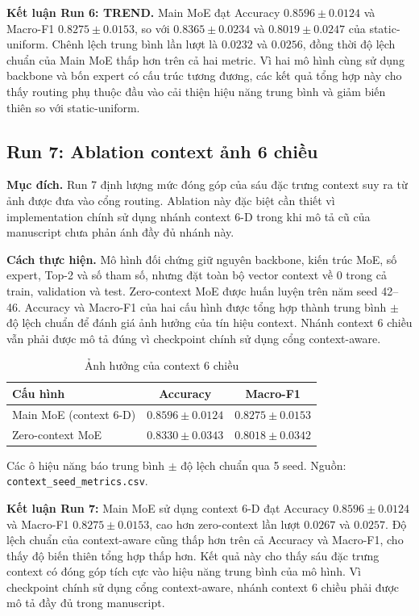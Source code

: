 \documentclass[conference]{IEEEtran}
\newcommand{\meanstd}{trung bình $\pm$ độ lệch chuẩn}
\newcommand{\best}[1]{\textbf{#1}}
\begin{document}
\textbf{Kết luận Run 6: TREND.} Main MoE đạt Accuracy
$0.8596\pm0.0124$ và Macro-F1 $0.8275\pm0.0153$, so với
$0.8365\pm0.0234$ và $0.8019\pm0.0247$ của static-uniform. Chênh lệch trung
bình lần lượt là $0.0232$ và $0.0256$, đồng thời độ lệch chuẩn của Main MoE
thấp hơn trên cả hai metric. Vì hai mô hình cùng sử dụng
backbone và bốn expert có cấu trúc tương đương, các kết quả tổng hợp này cho
thấy routing phụ thuộc đầu vào cải thiện hiệu năng trung bình và giảm biến
thiên so với static-uniform.

\subsection{Run 7: Ablation context ảnh 6 chiều}

\textbf{Mục đích.} Run 7 định lượng mức đóng góp của sáu đặc trưng context
suy ra từ ảnh được đưa vào cổng routing. Ablation này đặc biệt cần thiết vì
implementation chính sử dụng nhánh context 6-D trong khi mô tả cũ của
manuscript chưa phản ánh đầy đủ nhánh này.

\textbf{Cách thực hiện.} Mô hình đối chứng giữ nguyên backbone, kiến trúc MoE,
số expert, Top-2 và số tham số, nhưng đặt toàn bộ vector context về 0 trong cả
train, validation và test. Zero-context MoE được huấn luyện trên năm seed
42--46. Accuracy và Macro-F1 của hai cấu hình được tổng hợp thành trung bình
$\pm$ độ lệch chuẩn để đánh giá ảnh hưởng của tín hiệu context. Nhánh context
6 chiều vẫn phải được mô tả đúng vì checkpoint chính sử dụng cổng
context-aware.

\begin{table}[H]
\caption{Ảnh hưởng của context 6 chiều}
\label{tab:context}
\centering
\footnotesize
\begin{tabular}{@{}lcc@{}}
\toprule
Cấu hình & Accuracy & Macro-F1 \\
\midrule
Main MoE (context 6-D) & \best{$0.8596\pm0.0124$} & \best{$0.8275\pm0.0153$} \\
Zero-context MoE & $0.8330\pm0.0343$ & $0.8018\pm0.0342$ \\
\bottomrule
\end{tabular}
\vspace{2pt}

\raggedright\scriptsize Các ô hiệu năng báo \meanstd{} qua 5 seed. Nguồn:
\texttt{context\_seed\_metrics.csv}.
\end{table}

\textbf{Kết luận Run 7:} Main MoE sử dụng context 6-D đạt Accuracy
$0.8596\pm0.0124$ và Macro-F1 $0.8275\pm0.0153$, cao hơn zero-context lần
lượt $0.0267$ và $0.0257$. Độ lệch chuẩn của context-aware cũng thấp hơn trên
cả Accuracy và Macro-F1, cho thấy độ biến thiên tổng hợp thấp hơn. Kết quả
này cho thấy sáu đặc trưng context có đóng góp tích cực vào hiệu năng trung
bình của mô hình. Vì checkpoint chính sử dụng cổng context-aware, nhánh
context 6 chiều phải được mô tả đầy đủ trong manuscript.
\end{document}
